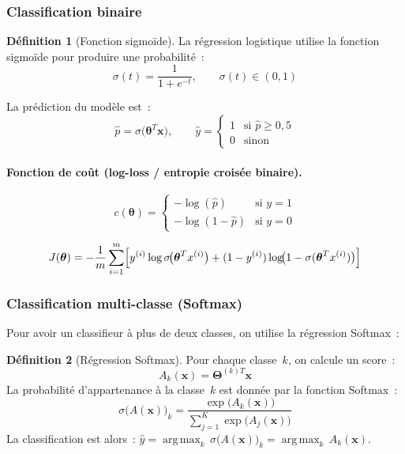 \documentclass[a4paper,12pt,twoside]{report}
\theoremstyle{definition}
\newtheorem{defi}{Définition}
\theoremstyle{plain}
\theoremstyle{remark}
\newcommand{\rv}[1]{\boldsymbol{#1}}
\DeclareMathOperator*{\argmax}{arg\,max}
\begin{document}
\subsubsection*{Classification binaire}

\begin{defi}[Fonction sigmoïde]
La régression logistique utilise la fonction sigmoïde pour produire une probabilité~:
\[
\sigma(t) = \frac{1}{1 + e^{-t}}, \qquad \sigma(t) \in (0,1)
\]
\end{defi}

La prédiction du modèle est~:
\[
\hat{p} = \sigma\!\bigl(\rv{\theta}^T \rv{x}\bigr),
\qquad
\hat{y} =
\begin{cases}
1 & \text{si } \hat{p} \geq 0{,}5 \\
0 & \text{sinon}
\end{cases}
\]

\paragraph{Fonction de coût (log-loss / entropie croisée binaire).}

\[
c(\rv{\theta}) =
\begin{cases}
-\log(\hat{p})   & \text{si } y = 1 \\
-\log(1-\hat{p}) & \text{si } y = 0
\end{cases}
\]

\[
J(\rv{\theta}) = -\frac{1}{m}\sum_{i=1}^{m}
\Bigl[
  y^{(i)}\log\sigma\!\bigl(\rv{\theta}^T x^{(i)}\bigr)
  + (1-y^{(i)})\log\!\bigl(1 - \sigma(\rv{\theta}^T x^{(i)})\bigr)
\Bigr]
\]

\subsubsection*{Classification multi-classe (Softmax)}

Pour avoir un classifieur à plus de deux classes, on utilise la régression Softmax~:

\begin{defi}[Régression Softmax]
Pour chaque classe~$k$, on calcule un score~:
\[
A_k(\rv{x}) = \rv{\Theta}^{(k)T}\rv{x}
\]
La probabilité d'appartenance à la classe~$k$ est donnée par la fonction Softmax~:
\[
\sigma\!\bigl(A(\rv{x})\bigr)_k
= \frac{\exp\bigl(A_k(\rv{x})\bigr)}
       {\displaystyle\sum_{j=1}^{K}\exp\bigl(A_j(\rv{x})\bigr)}
\]
La classification est alors~:
$\hat{y} = \argmax_k\, \sigma\!\bigl(A(\rv{x})\bigr)_k = \argmax_k\, A_k(\rv{x})$.
\end{defi}
\end{document}
